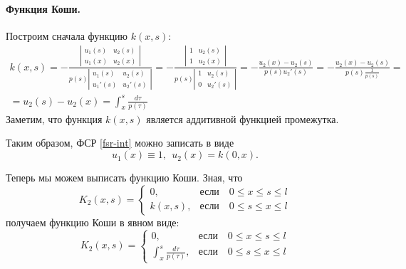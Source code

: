 \documentclass[a4paper,12pt]{article} %
\begin{document}
\paragraph{Функция Коши.}
Построим сначала функцию $k(x, s)$:
\begin{multline}
	k(x,s) =
	- \frac{
		\left|\begin{array}{cc}
			u_1(s)  & u_2(s) \\
			u_1(x)  & u_2(x)
		\end{array}\right|
	}{
		p(s)
		\left|\begin{array}{cc}
			u_1 (s) & u_2 (s) \\
			u_1'(s) & u_2'(s)
		\end{array}\right|
	}
	=
	- \frac{
		\left|\begin{array}{cc}
			1  & u_2(s) \\
			1  & u_2(x)
		\end{array}\right|
	}{
		p(s)
		\left|\begin{array}{cc}
			1 & u_2 (s) \\
			0 & u_2'(s)
		\end{array}\right|
	}
	=
	- \frac{
		u_2(x) - u_2(s)
	}{
		p(s) u_2'(s)
	}
	=
	- \frac{
		u_2(x) - u_2(s)
	}{
		p(s) \frac{1}{p(s)}
	}
	=
	\\=
	u_2(s) - u_2(x)
	=
	\int_x^s\frac{d\tau}{p(\tau)}
\end{multline}
Заметим, что функция $k(x,s)$ является аддитивной функцией промежутка.

Таким образом, ФСР \eqref{fsr-int} можно записать в виде
\begin{equation}\label{fsr-k}
	u_1(x) \equiv 1, ~~ u_2(x) = k(0,x).
\end{equation}

Теперь мы можем выписать функцию Коши.
Зная, что
\begin{equation}
	K_2(x, s) = \begin{cases}
		0     , & \mbox{если~~~} 0 \leq x \leq s \leq l
		\\
		k(x,s), & \mbox{если~~~} 0 \leq s \leq x \leq l
	\end{cases}
\end{equation}
получаем функцию Коши в явном виде:
\begin{equation}
	K_2(x, s) = \begin{cases}
		0     , & \mbox{если~~~} 0 \leq x \leq s \leq l
		\\
		\int_x^s\frac{d\tau}{p(\tau)}, & \mbox{если~~~} 0 \leq s \leq x \leq l
	\end{cases}
\end{equation}
\end{document}
